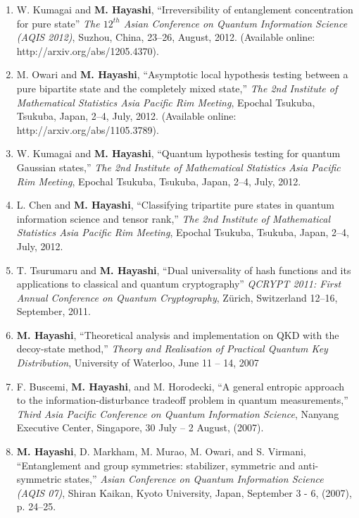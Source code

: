 \documentclass[a4paper,12pt,oneside]{article}
\begin{document}
\begin{enumerate}
\item 
W. Kumagai and \textbf{M. Hayashi}, ``Irreversibility of entanglement concentration for pure state''
{\em The $12^{th}$ Asian Conference on Quantum Information Science (AQIS 2012)},
Suzhou, China, 23--26, August, 2012.
(Available online: http://arxiv.org/abs/1205.4370).

\item 
M. Owari and \textbf{M. Hayashi}, 
``Asymptotic local hypothesis testing between a pure bipartite state and the completely mixed state,''
{\em The 2nd Institute of Mathematical Statistics Asia Pacific Rim Meeting}, 
Epochal Tsukuba, Tsukuba, Japan, 2--4, July, 2012.
(Available online: http://arxiv.org/abs/1105.3789).

\item 
W. Kumagai and \textbf{M. Hayashi}, 
``Quantum hypothesis testing for quantum Gaussian states,'' 
{\em The 2nd Institute of Mathematical Statistics Asia Pacific Rim Meeting}, 
Epochal Tsukuba, Tsukuba, Japan, 2--4, July, 2012.

\item 
L. Chen and \textbf{M. Hayashi}, 
``Classifying tripartite pure states in quantum information science and tensor rank,'' 
{\em The 2nd Institute of Mathematical Statistics Asia Pacific Rim Meeting}, 
Epochal Tsukuba, Tsukuba, Japan, 2--4, July, 2012.

\item 
T. Tsurumaru and \textbf{M. Hayashi}, ``Dual universality of hash functions and its applications to classical and quantum cryptography'' 
{\em QCRYPT 2011: First Annual Conference on Quantum Cryptography}, 
Z\"{u}rich, Switzerland 12--16, September, 2011.

\item
\textbf{M. Hayashi}, ``Theoretical analysis and implementation on QKD with the decoy-state method,'' 
{\em Theory and Realisation of Practical Quantum Key Distribution}, 
University of Waterloo, June 11 -- 14, 2007

\item
F. Buscemi, \textbf{M. Hayashi}, and M. Horodecki, ``A general entropic approach to the information-disturbance tradeoff problem in quantum measurements,'' 
{\em Third Asia Pacific Conference on Quantum Information Science}, 
Nanyang Executive Center, Singapore, 
30 July -- 2 August, (2007).

\item
\textbf{M. Hayashi}, D. Markham, M. Murao, M. Owari, and S. Virmani, ``Entanglement and group symmetries: stabilizer, symmetric and anti-symmetric states,'' 
{\em Asian Conference on Quantum Information Science (AQIS 07)}, 
Shiran Kaikan, Kyoto University, Japan, September 3 - 6, (2007), p. 24--25.


\end{enumerate}
\end{document}
